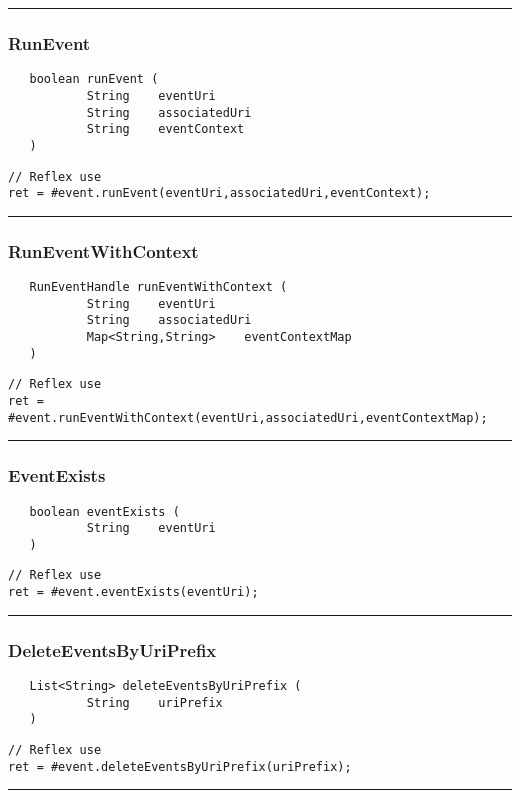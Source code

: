 \rule{15cm}{2pt}
\subsubsection{RunEvent}
\label{Api:RunEvent}
\begin{verbatim}
   boolean runEvent (
           String    eventUri
           String    associatedUri
           String    eventContext
   )
\end{verbatim}
\begin{lstlisting}[language=reflex]
// Reflex use
ret = #event.runEvent(eventUri,associatedUri,eventContext);
\end{lstlisting}



\rule{15cm}{2pt}
\subsubsection{RunEventWithContext}
\label{Api:RunEventWithContext}
\begin{verbatim}
   RunEventHandle runEventWithContext (
           String    eventUri
           String    associatedUri
           Map<String,String>    eventContextMap
   )
\end{verbatim}
\begin{lstlisting}[language=reflex]
// Reflex use
ret = #event.runEventWithContext(eventUri,associatedUri,eventContextMap);
\end{lstlisting}



\rule{15cm}{2pt}
\subsubsection{EventExists}
\label{Api:EventExists}
\begin{verbatim}
   boolean eventExists (
           String    eventUri
   )
\end{verbatim}
\begin{lstlisting}[language=reflex]
// Reflex use
ret = #event.eventExists(eventUri);
\end{lstlisting}



\rule{15cm}{2pt}
\subsubsection{DeleteEventsByUriPrefix}
\label{Api:DeleteEventsByUriPrefix}
\begin{verbatim}
   List<String> deleteEventsByUriPrefix (
           String    uriPrefix
   )
\end{verbatim}
\begin{lstlisting}[language=reflex]
// Reflex use
ret = #event.deleteEventsByUriPrefix(uriPrefix);
\end{lstlisting}



\rule{15cm}{2pt}
